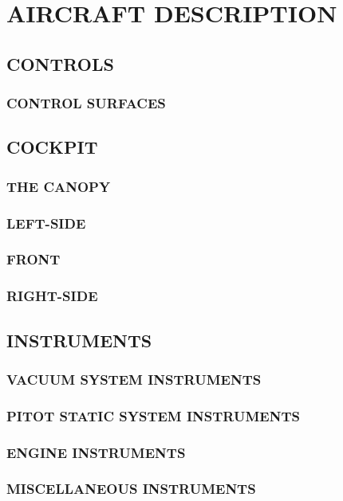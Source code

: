 \chapter{AIRCRAFT DESCRIPTION}
\minitoc{}
\cleardoublepage{}


\section{CONTROLS}
\subsection{CONTROL SURFACES}

\section{COCKPIT}
\subsection{THE CANOPY}
\subsection{LEFT-SIDE}
\subsection{FRONT}
\subsection{RIGHT-SIDE}


\section{INSTRUMENTS}
\subsection{VACUUM SYSTEM INSTRUMENTS}
\subsection{PITOT STATIC SYSTEM INSTRUMENTS}
\subsection{ENGINE INSTRUMENTS}
\subsection{MISCELLANEOUS INSTRUMENTS}


